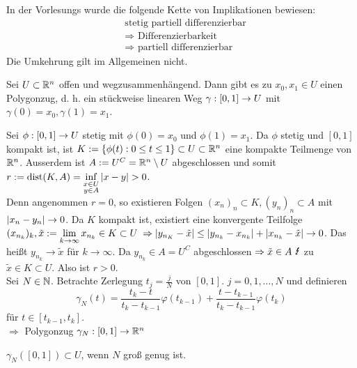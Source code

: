 \documentclass[../ana2.tex]{subfiles}
\begin{document}
In der Vorlesungs wurde die folgende Kette von Implikationen bewiesen:
\begin{align*}
    &\text{stetig partiell differenzierbar} \\
    &\Rightarrow \text{ Differenzierbarkeit} \\
    &\Rightarrow \text{ partiell differenzierbar}
\end{align*}
Die Umkehrung gilt im Allgemeinen nicht.
\begin{lem}
    Sei \(U \subset \mathbb{R}^n \) offen und wegzusammenhängend. 
    Dann gibt es zu \(x_0, x_1 \in U\) einen Polygonzug, d. h. 
    ein stückweise linearen Weg \(\gamma:[0,1]\rightarrow U\) mit
    \(\gamma(0) = x_0, \gamma(1) = x_1\).
\end{lem}
\begin{bew}
    Sei \(\phi:[0,1]\rightarrow U\) stetig mit \(\phi(0) = x_0\)
    und \(\phi(1) = x_1\). Da \(\phi\) stetig und \([0,1]\)
    kompakt ist, ist \( K:= \{\phi(t): 0 \leq t \leq 1\} \subset U \subset \mathbb{R}^n \)
    eine kompakte Teilmenge von \(\mathbb{R}^n\). Ausserdem ist 
    \(A := U^C = \mathbb{R}^n \setminus U\) abgeschlossen und somit 
    \(r := \operatorname{dist}(K, A) = 
    \underset{\substack{x \in U \\ y \in A}}{\inf} 
    \left|x-y\right| > 0\). \\
    Denn angenommen \( r = 0 \), so existieren 
    Folgen \( (x_n)_n \subset K, (y_n)_n \subset A \)
    mit \( \left|x_n - y_n\right| \rightarrow 0 \).
    Da \(K\) kompakt ist, existiert eine konvergente Teilfolge
    \( (x_{n_k})_k, \tilde{x} := \lim\limits_{k\rightarrow\infty} x_{n_k} \in K \subset U \)    
    \( \Rightarrow \left| y_{n_K} - \tilde{x} \right|
    \leq \left| y_{n_k} - x_{n_k} \right| 
    + \left| x_{n_k} - \tilde{x} \right| \rightarrow 0 \).
    Das heißt \( y_{n_k} \rightarrow \tilde{x} \) 
    für \(k \rightarrow \infty \). Da 
    \( y_{n_k} \in A = U^C \) abgeschlossen
    \( \Rightarrow \tilde{x} \in A \text{ \Lightning} \) 
    zu \(\tilde{x} \in K \subset U\). 
    Also ist \(r > 0\).\\
    Sei \( N\in\mathbb{N} \). Betrachte Zerlegung
    \( t_j = \frac{j}{N} \) von \( [0,1] \).
    \( j = 0,1,\ldots,N \) und definieren
    \[ \gamma_N(t) = \frac{t_k -t}{t_k-t_{k-1}} \varphi(t_{k-1}) 
    + \frac{t-t_{k-1}}{t_k - t_{k-1}} \varphi(t_k) \]
    für \( t \in [t_{k-1}, t_k] \).\\
    \(\Rightarrow\) Polygonzug \(\gamma_N:[0,1]\rightarrow \mathbb{R}^n\)
    \begin{beh}
        \( \gamma_N([0,1]) \subset U \), 
        wenn \(N\) groß genug ist.
    \end{beh}

\end{bew}
\end{document}

